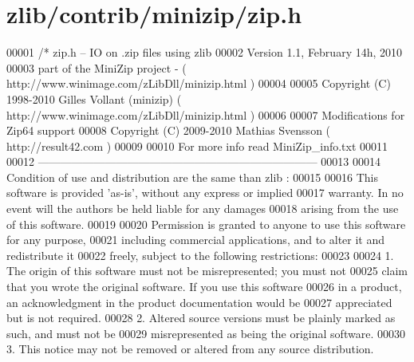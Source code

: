 \hypertarget{zlib_2contrib_2minizip_2zip_8h_source}{}\section{zlib/contrib/minizip/zip.h}
\label{zlib_2contrib_2minizip_2zip_8h_source}

\begin{DoxyCode}
00001 \textcolor{comment}{/* zip.h -- IO on .zip files using zlib}
00002 \textcolor{comment}{   Version 1.1, February 14h, 2010}
00003 \textcolor{comment}{   part of the MiniZip project - ( http://www.winimage.com/zLibDll/minizip.html )}
00004 \textcolor{comment}{}
00005 \textcolor{comment}{         Copyright (C) 1998-2010 Gilles Vollant (minizip) ( http://www.winimage.com/zLibDll/minizip.html )}
00006 \textcolor{comment}{}
00007 \textcolor{comment}{         Modifications for Zip64 support}
00008 \textcolor{comment}{         Copyright (C) 2009-2010 Mathias Svensson ( http://result42.com )}
00009 \textcolor{comment}{}
00010 \textcolor{comment}{         For more info read MiniZip\_info.txt}
00011 \textcolor{comment}{}
00012 \textcolor{comment}{         ---------------------------------------------------------------------------}
00013 \textcolor{comment}{}
00014 \textcolor{comment}{   Condition of use and distribution are the same than zlib :}
00015 \textcolor{comment}{}
00016 \textcolor{comment}{  This software is provided 'as-is', without any express or implied}
00017 \textcolor{comment}{  warranty.  In no event will the authors be held liable for any damages}
00018 \textcolor{comment}{  arising from the use of this software.}
00019 \textcolor{comment}{}
00020 \textcolor{comment}{  Permission is granted to anyone to use this software for any purpose,}
00021 \textcolor{comment}{  including commercial applications, and to alter it and redistribute it}
00022 \textcolor{comment}{  freely, subject to the following restrictions:}
00023 \textcolor{comment}{}
00024 \textcolor{comment}{  1. The origin of this software must not be misrepresented; you must not}
00025 \textcolor{comment}{     claim that you wrote the original software. If you use this software}
00026 \textcolor{comment}{     in a product, an acknowledgment in the product documentation would be}
00027 \textcolor{comment}{     appreciated but is not required.}
00028 \textcolor{comment}{  2. Altered source versions must be plainly marked as such, and must not be}
00029 \textcolor{comment}{     misrepresented as being the original software.}
00030 \textcolor{comment}{  3. This notice may not be removed or altered from any source distribution.}

\end{DoxyCode}
